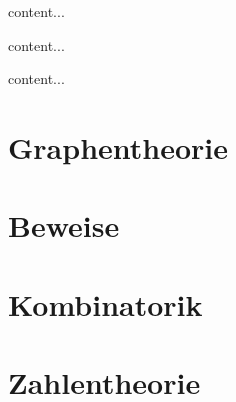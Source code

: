 \begin{definition}[Funktionen]
	content...
\end{definition}

\begin{definition}[Kardinalitäten]
	content...
\end{definition}

\begin{definition}[Multimenge]
	content...
\end{definition}

\section{Graphentheorie}

\section{Beweise}

\section{Kombinatorik}

\section{Zahlentheorie}

